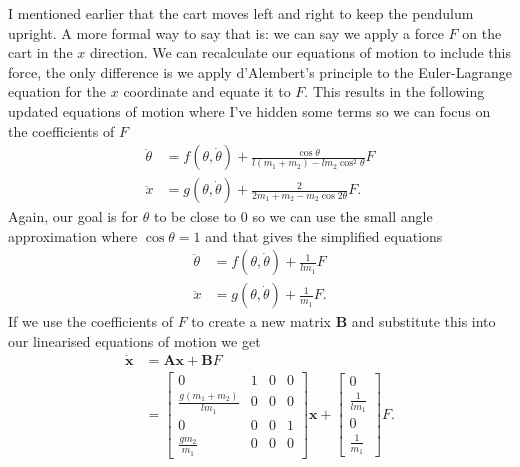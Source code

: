 \documentclass{article}
\renewcommand{\vec}[1]{\boldsymbol{\mathbf{#1}}}
\newcommand{\dvec}[1]{\dot{\vec{#1}}}
\begin{document}
I mentioned earlier that the cart moves left and right to keep the pendulum upright. A more formal way to say that is: we can say we apply a force $F$ on the cart in the $x$ direction. We can recalculate our equations of motion to include this force, the only difference is we apply d'Alembert's principle to the Euler-Lagrange equation for the $x$ coordinate and equate it to $F$. This results in the following updated equations of motion where I've hidden some terms so we can focus on the coefficients of $F$ \begin{align*}
  \ddot{\theta} & = f(\theta, \dot{\theta}) + \frac{\cos \theta}{l (m_1 + m_2) - l m_2 \cos^2 \theta} F \\
  \ddot{x}      & = g(\theta, \dot{\theta}) + \frac{2}{2 m_1 + m_2 - m_2 \cos 2 \theta} F.
\end{align*} Again, our goal is for $\theta$ to be close to $0$ so we can use the small angle approximation where $\cos \theta = 1$ and that gives the simplified equations \begin{align*}
  \ddot{\theta} & = f(\theta, \dot{\theta}) + \frac{1}{l m_1} F \\
  \ddot{x}      & = g(\theta, \dot{\theta}) + \frac{1}{m_1} F.
\end{align*} If we use the coefficients of $F$ to create a new matrix $\vec{B}$ and substitute this into our linearised equations of motion we get \begin{align*}
  \dvec{x} & = \vec{A} \vec{x} + \vec{B} F              \\
           & = \begin{bmatrix}
                 0                           & 1 & 0 & 0 \\
                 \frac{g (m_1 + m_2)}{l m_1} & 0 & 0 & 0 \\
                 0                           & 0 & 0 & 1 \\
                 \frac{g m_2}{m_1}           & 0 & 0 & 0
               \end{bmatrix} \vec{x} + \begin{bmatrix}
                                         0               \\
                                         \frac{1}{l m_1} \\
                                         0               \\
                                         \frac{1}{m_1}
                                       \end{bmatrix} F.
\end{align*}
\end{document}
